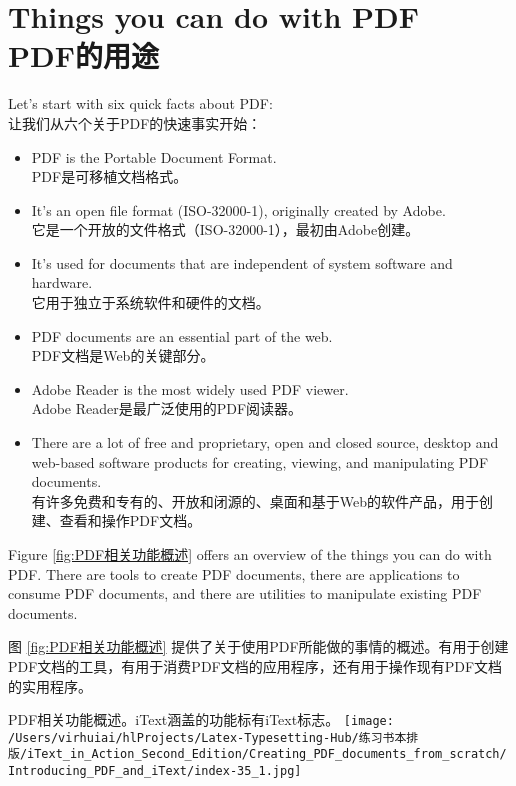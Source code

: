\setcounter{chapter}{1}
\section{Things you can do with PDF\\PDF的用途}

Let’s start with six quick facts about PDF:\\让我们从六个关于PDF的快速事实开始：

\begin{itemize}
\item
PDF is the Portable Document Format.\\PDF是可移植文档格式。

\item
It’s an open file format (ISO-32000-1), originally created by Adobe.\\它是一个开放的文件格式（ISO-32000-1），最初由Adobe创建。

\item
It’s used for documents that are independent of system software and hardware.\\它用于独立于系统软件和硬件的文档。

\item
PDF documents are an essential part of the web.\\PDF文档是Web的关键部分。

\item
Adobe Reader is the most widely used PDF viewer.\\Adobe Reader是最广泛使用的PDF阅读器。

\item
There are a lot of free and proprietary, open and closed source, desktop and web-based software products for creating, viewing, and manipulating PDF documents.\\有许多免费和专有的、开放和闭源的、桌面和基于Web的软件产品，用于创建、查看和操作PDF文档。
\end{itemize}

Figure \ref{fig:PDF相关功能概述} offers an overview of the things you can do with PDF. There are tools to create PDF documents, there are applications to consume PDF documents, and there are utilities to manipulate existing PDF documents.

图 \ref{fig:PDF相关功能概述} 提供了关于使用PDF所能做的事情的概述。有用于创建PDF文档的工具，有用于消费PDF文档的应用程序，还有用于操作现有PDF文档的实用程序。

\begin{myfigure}{PDF相关功能概述。iText涵盖的功能标有iText标志。\label{fig:PDF相关功能概述}}
\texttt{[image: /Users/virhuiai/hlProjects/Latex-Typesetting-Hub/练习书本排版/iText\_in\_Action\_Second\_Edition/Creating\_PDF\_documents\_from\_scratch/Introducing\_PDF\_and\_iText/index-35\_1.jpg]}
\end{myfigure}

